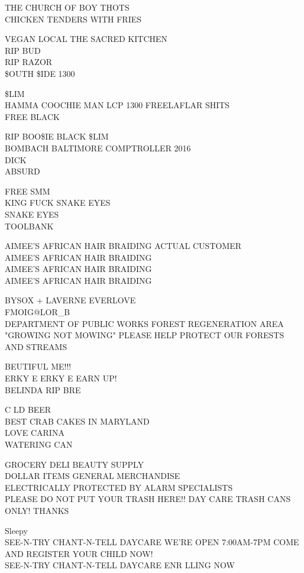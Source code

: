 \documentclass[10pt,letterpaper]{article}
\begin{document}
THE CHURCH OF BOY THOTS\\
CHICKEN TENDERS WITH FRIES

VEGAN LOCAL THE SACRED KITCHEN\\
RIP BUD\\
RIP RAZOR\\
\$OUTH \$IDE 1300

\$LIM\\
HAMMA COOCHIE MAN LCP 1300 FREELAFLAR SHITS\\
FREE BLACK

RIP BOO\$IE BLACK \$LIM\\
BOMBACH BALTIMORE COMPTROLLER 2016\\
DICK\\
ABSURD

FREE SMM\\
KING FUCK SNAKE EYES\\
SNAKE EYES\\
TOOLBANK

AIMEE'S AFRICAN HAIR BRAIDING ACTUAL CUSTOMER\\
AIMEE'S AFRICAN HAIR BRAIDING\\
AIMEE'S AFRICAN HAIR BRAIDING\\
AIMEE'S AFRICAN HAIR BRAIDING

BYSOX + LAVERNE EVERLOVE\\
FMOIG@LOR\_B\\
DEPARTMENT OF PUBLIC WORKS FOREST REGENERATION AREA "GROWING NOT MOWING" PLEASE HELP PROTECT OUR FORESTS AND STREAMS

BEUTIFUL ME!!!\\
ERKY E ERKY E EARN UP!\\
BELINDA RIP BRE

C LD BEER\\
BEST CRAB CAKES IN MARYLAND\\
LOVE CARINA\\
WATERING CAN

GROCERY DELI BEAUTY SUPPLY\\
DOLLAR ITEMS GENERAL MERCHANDISE\\
ELECTRICALLY PROTECTED BY ALARM SPECIALISTS\\
PLEASE DO NOT PUT YOUR TRASH HERE!! DAY CARE TRASH CANS ONLY!  THANKS

Sleepy\\
SEE{-}N{-}TRY CHANT{-}N{-}TELL DAYCARE WE'RE OPEN 7:00AM{-}7PM COME AND REGISTER YOUR CHILD NOW!\\
SEE{-}N{-}TRY CHANT{-}N{-}TELL DAYCARE ENR LLING NOW
\end{document}
